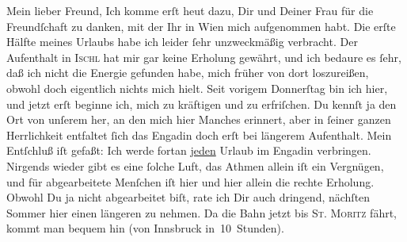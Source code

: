 \begin{ledgroupsized}[t]{13cm}
           \pstart\center{}Mein lieber Freund,\pend\pstart
           Ich komme erſt heut dazu, Dir und Deiner Frau für die Freundſchaft zu
               danken, mit der Ihr in Wien mich aufgenommen
               habt.\pend
           \pstart
           Die erſte Hälfte meines Urlaubs habe ich leider ſehr unzweckmäßig verbracht. Der
               Aufenthalt in \textsc{Ischl} hat mir gar keine Erholung gewährt, und ich bedaure {\pb}es ſehr, daß ich nicht die Energie gefunden habe, mich
               früher von dort loszureißen, obwohl doch eigentlich nichts mich hielt. Seit vorigem
                  Donnerſtag bin ich hier, und jetzt erſt beginne
               ich, mich zu kräftigen und zu erfriſchen. Du kennſt ja den Ort von unſerem \label{K_L03080-2v}\label{K_L03080-2h} her, an den \strikeout{\textcolor{gray}{ich}} mich  hier Manches erinnert, aber in ſeiner ganzen Herrlichkeit entfaltet ſich das
                  Engadin doch erſt bei längerem Aufenthalt.
               Mein Entſchluß iſt gefaßt: Ich werde fortan \uline{jeden}
               Urlaub im Engadin verbringen. Nirgends wieder
               gibt es eine {\pb}ſolche Luft, das Athmen allein iſt ein
               Vergnügen, und für abgearbeitete Menſchen iſt hier und hier allein die rechte
               Erholung. Obwohl Du ja nicht abgearbeitet biſt, rate ich Dir auch dringend, nächſten
               Sommer hier einen längeren \label{K_L03080-3v}\label{K_L03080-3h} zu nehmen. Da die
               Bahn jetzt bis \textsc{St. Moritz} fährt, kommt man bequem hin (von Innsbruck
               in 10 Stunden).\pend
           \pstart

\end{ledgroupsized}
